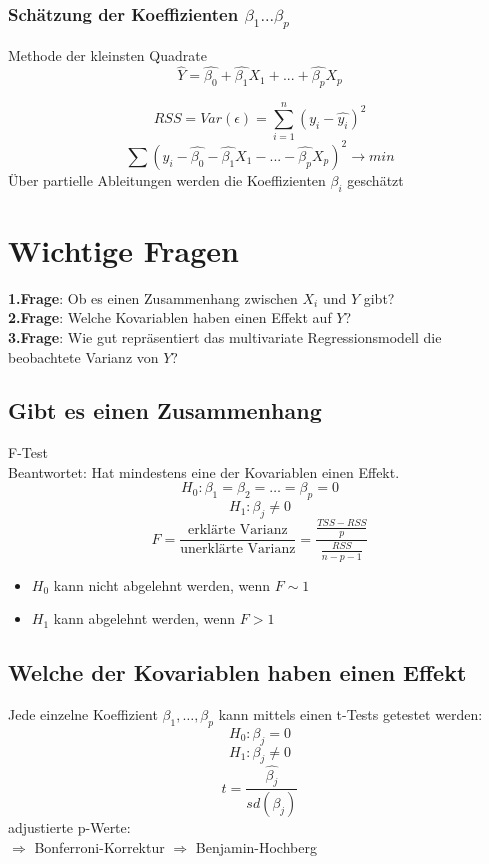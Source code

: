 \documentclass[10pt]{report}
\theoremstyle{definition}
\begin{document}
\subsubsection{Schätzung der Koeffizienten $\beta_1 ... \beta_p$}
Methode der kleinsten Quadrate
\[\hat{Y} = \hat{\beta_0} + \hat{\beta_1} X_1 + ... + \hat{\beta_p} X_p \]

\[ RSS = Var(\epsilon)= \sum\limits_{i=1}^n (y_i - \hat{y_i} )^2 \]
\[ \sum (y_i - \hat{\beta_0} - \hat{\beta_1} X_1 - ... - \hat{\beta_p} X_p )^2 \rightarrow min \]
Über partielle Ableitungen werden die Koeffizienten $\beta_i$ geschätzt


\section{Wichtige Fragen}
\textbf{1.Frage}: Ob es einen Zusammenhang zwischen $X_i$ und $Y$ gibt? \\
\textbf{2.Frage}: Welche Kovariablen haben einen Effekt auf $Y$? \\
\textbf{3.Frage}: Wie gut repräsentiert das multivariate Regressionsmodell die beobachtete Varianz von $Y$?\\

\subsection{Gibt es einen Zusammenhang} F-Test\\
Beantwortet: Hat mindestens eine der Kovariablen einen Effekt.
\[ H_0: \beta_1=\beta_2=\dots=\beta_p=0 \]
\[ H_1: \beta_j \neq 0 \]
\[F= \frac{\text{erklärte Varianz}}{\text{unerklärte Varianz}} = \frac{\frac{TSS - RSS}{p}}{\frac{RSS}{n-p-1}} \]
\begin{itemize}
	\item $H_0$ kann nicht abgelehnt werden, wenn $F \sim 1$
	\item $H_1$ kann abgelehnt werden, wenn $F > 1$
\end{itemize}

\subsection{Welche der Kovariablen haben einen Effekt}
Jede einzelne Koeffizient $\beta_1,\dots,\beta_p$ kann mittels einen t-Tests getestet werden:
\[ H_0: \beta_j = 0 \]
\[H_1: \beta_j \neq 0 \]
\[ t= \frac{\hat{\beta_j}}{sd(\beta_j)} \]
adjustierte p-Werte: \\
$\Rightarrow$ Bonferroni-Korrektur
$\Rightarrow$ Benjamin-Hochberg
\end{document}
